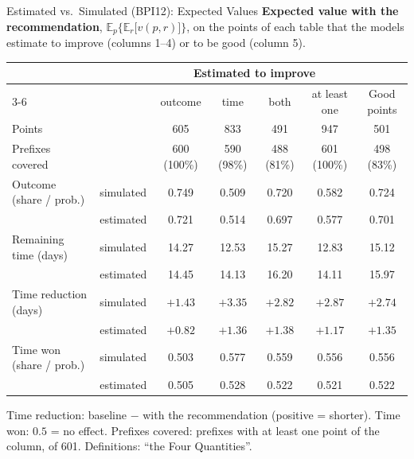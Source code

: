 \documentclass[aspectratio=169]{beamer} %
\begin{document}
\begin{frame}{Estimated vs.\ Simulated (BPI12): Expected Values}
  \scriptsize\setlength{\aboverulesep}{0pt}\setlength{\belowrulesep}{1pt}
  \textbf{Expected value with the recommendation}, $\mathbb{E}_p\big\{\mathbb{E}_r\big[v(p,r)\big]\big\}$,
  on the points of each table that the models estimate to improve (columns 1--4) or to be good (column 5).
  \begin{center}\setlength{\tabcolsep}{3pt}
  \begin{tabular}{ll ccccc}
    \toprule
     & & \multicolumn{4}{c}{Estimated to improve} & \\
    \cmidrule(lr){3-6}
     & & outcome & time & both & at least one & Good points \\
    \midrule
    Points & & 605 & 833 & 491 & 947 & 501 \\
    Prefixes covered & & 600 (100\%) & 590 (98\%) & 488 (81\%) & 601 (100\%) & 498 (83\%) \\
    \midrule
    Outcome (share / prob.) & simulated & 0.749 & 0.509 & 0.720 & 0.582 & 0.724 \\
     & estimated & 0.721 & 0.514 & 0.697 & 0.577 & 0.701 \\
    \addlinespace[2pt]
    Remaining time (days) & simulated & 14.27 & 12.53 & 15.27 & 12.83 & 15.12 \\
     & estimated & 14.45 & 14.13 & 16.20 & 14.11 & 15.97 \\
    \addlinespace[2pt]
    Time reduction (days) & simulated & $+1.43$ & $+3.35$ & $+2.82$ & $+2.87$ & $+2.74$ \\
     & estimated & $+0.82$ & $+1.36$ & $+1.38$ & $+1.17$ & $+1.35$ \\
    \addlinespace[2pt]
    Time won (share / prob.) & simulated & 0.503 & 0.577 & 0.559 & 0.556 & 0.556 \\
     & estimated & 0.505 & 0.528 & 0.522 & 0.521 & 0.522 \\
    \bottomrule
  \end{tabular}
  \end{center}
  {\tiny Time reduction: baseline $-$ with the recommendation (positive = shorter). Time won: $0.5$ = no effect.
  Prefixes covered: prefixes with at least one point of the column, of 601. Definitions: ``the Four Quantities''.}
\end{frame}
\end{document}
